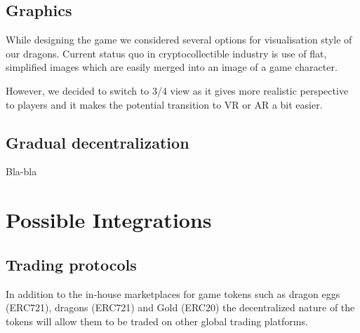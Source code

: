 \documentclass[12pt]{article}
\begin{document}

\vspace{\baselineskip}\subsection{Graphics}
  \label{Graphics}  \par

While designing the game we considered several options for visualisation style of our dragons. Current status quo in cryptocollectible industry is  use of flat, simplified images which are easily merged into an image of a game character.\par

However, we decided to switch to 3/4 view as it gives more realistic perspective to players and it makes the potential transition to VR or AR a bit easier.



\vspace{\baselineskip}\subsection{Gradual decentralization}
\label{Gradual decentralization}  \par

Bla-bla\par


\newpage
\par

\section{Possible Integrations}
 \label{Possible Integrations}  \par


\vspace{\baselineskip}
\subsection{Trading protocols}\label{Trading protocols}\par

In addition to the in-house marketplaces for game tokens such as dragon eggs (ERC721), dragons (ERC721) and Gold (ERC20) the decentralized nature of the tokens will allow them to be traded on other global trading platforms.\par
\end{document}
